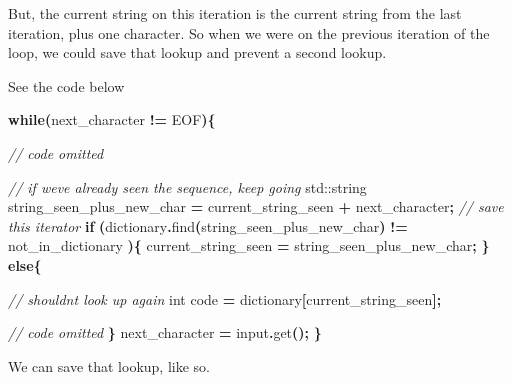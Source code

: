 \documentclass[12pt,twoside]{reedthesis}
\newenvironment{Shaded}{\begin{snugshade}}{\end{snugshade}}
\newcommand{\BuiltInTok}[1]{#1}
\newcommand{\CommentTok}[1]{\textcolor[rgb]{0.56,0.35,0.01}{\textit{#1}}}
\newcommand{\ControlFlowTok}[1]{\textcolor[rgb]{0.13,0.29,0.53}{\textbf{#1}}}
\newcommand{\DataTypeTok}[1]{\textcolor[rgb]{0.13,0.29,0.53}{#1}}
\newcommand{\NormalTok}[1]{#1}
\newcommand{\OperatorTok}[1]{\textcolor[rgb]{0.81,0.36,0.00}{\textbf{#1}}}
\begin{document}
But, the current string on this iteration is the current string from the last iteration, plus one character. So when we were on the previous iteration of the loop, we could save that lookup and prevent a second lookup.

See the code below
\begin{Shaded}
\begin{Highlighting}[]
    \ControlFlowTok{while}\OperatorTok{(}\NormalTok{next\_character }\OperatorTok{!=}\NormalTok{ EOF}\OperatorTok{)\{}

        \CommentTok{// code omitted}


        \CommentTok{// if we\textquotesingle{}ve already seen the sequence, keep going}
        \BuiltInTok{std::}\NormalTok{string}\OperatorTok{ }\NormalTok{string\_seen\_plus\_new\_char }\OperatorTok{=}\NormalTok{ current\_string\_seen }\OperatorTok{+}\NormalTok{ next\_character}\OperatorTok{;}
        \CommentTok{// save this iterator\textasciigrave{}}
        \ControlFlowTok{if} \OperatorTok{(}\NormalTok{dictionary}\OperatorTok{.}\NormalTok{find}\OperatorTok{(}\NormalTok{string\_seen\_plus\_new\_char}\OperatorTok{)} \OperatorTok{!=}\NormalTok{ not\_in\_dictionary }\OperatorTok{)\{}
\NormalTok{            current\_string\_seen }\OperatorTok{=}\NormalTok{ string\_seen\_plus\_new\_char}\OperatorTok{;}
        \OperatorTok{\}}
        \ControlFlowTok{else}\OperatorTok{\{}

            \CommentTok{// shouldn\textquotesingle{}t look up again}
            \DataTypeTok{int}\NormalTok{ code }\OperatorTok{=}\NormalTok{ dictionary}\OperatorTok{[}\NormalTok{current\_string\_seen}\OperatorTok{];}


            \CommentTok{// code omitted}
        \OperatorTok{\}}
\NormalTok{        next\_character }\OperatorTok{=}\NormalTok{ input}\OperatorTok{.}\NormalTok{get}\OperatorTok{();}
    \OperatorTok{\}}
\end{Highlighting}
\end{Shaded}
We can save that lookup, like so.
\end{document}
